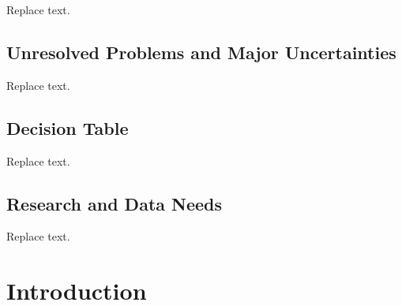 \documentclass[11pt,
  english,
  a4paper,
]{article}
\begin{document}
\leavevmode\tagmcend\tagstructend

Replace text.


\hypertarget{unresolved-problems-and-major-uncertainties}{%
\subsection*{Unresolved Problems and Major Uncertainties}\label{unresolved-problems-and-major-uncertainties}}

\leavevmode\tagmcend\tagstructend

Replace text.


\hypertarget{decision-table}{%
\subsection*{Decision Table}\label{decision-table}}

\leavevmode\tagmcend\tagstructend

Replace text.


\hypertarget{research-and-data-needs}{%
\subsection*{Research and Data Needs}\label{research-and-data-needs}}

\leavevmode\tagmcend\tagstructend

Replace text.

\pagebreak
\setlength{\parskip}{5mm plus1mm minus1mm}
\setcounter{page}{1}
\renewcommand{\thefigure}{\arabic{figure}}
\renewcommand{\thetable}{\arabic{table}}
\setcounter{table}{0}
\setcounter{figure}{0}


\hypertarget{introduction}{%
\section{Introduction}\label{introduction}}

\leavevmode\tagmcend\tagstructend
\end{document}
